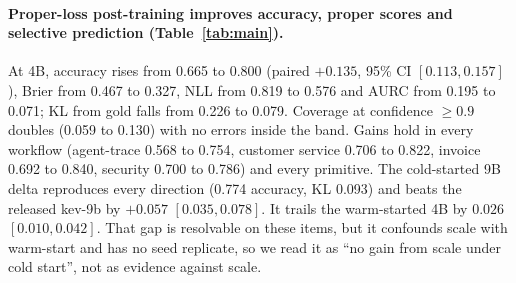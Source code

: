 \documentclass{article}
\begin{document}
\paragraph{Proper-loss post-training improves accuracy, proper scores and
selective prediction (Table~\ref{tab:main}).} At 4B, accuracy rises from
0.665 to 0.800 (paired $+0.135$, 95\% CI $[0.113, 0.157]$), Brier from
0.467 to 0.327, NLL from 0.819 to 0.576 and AURC from 0.195 to 0.071; KL
from gold falls from 0.226 to 0.079. Coverage at confidence $\ge0.9$ doubles
(0.059 to 0.130) with no errors inside the band. Gains hold in every
workflow (agent-trace 0.568 to 0.754, customer service 0.706 to 0.822,
invoice 0.692 to 0.840, security 0.700 to 0.786) and every primitive. The
cold-started 9B delta reproduces every direction (0.774 accuracy, KL 0.093)
and beats the released kev-9b by $+0.057$ $[0.035, 0.078]$. It trails the
warm-started 4B by $0.026$ $[0.010, 0.042]$. That gap is resolvable on these
items, but it confounds scale with warm-start and has no seed replicate, so
we read it as ``no gain from scale under cold start'', not as evidence
against scale.

\begin{table}[t]
\centering\small
{}
\caption{Held-out v1 test (400 cases, 1,945 decisions). ``$+T$'' is the
five-fold group-disjoint cross-fit temperature ($T\approx0.41$ at 4B, $0.45$
at 9B). ECE 95\% CIs: 4B $[0.143, 0.180]$ raw, $[0.009, 0.030]$ cross-fit;
9B $[0.131, 0.168]$, $[0.013, 0.039]$. $^\dagger$KL at the train-fit
$T^\star=0.35$ (ECE 0.032, NLL 0.464). v2-9B logits were not retained, so
its temperature-scaled and KL columns are not computed. kev-4b is scored at
its shipped $T=2.41$.}
\label{tab:main}
\end{table}
\end{document}
